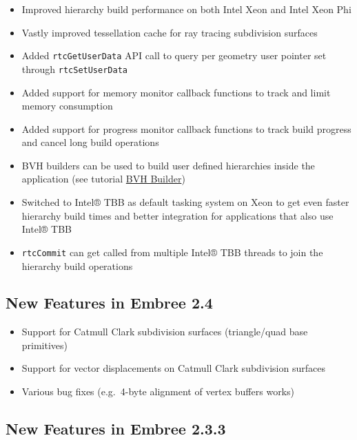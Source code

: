 \begin{itemize}
\tightlist
\item
  Improved hierarchy build performance on both Intel Xeon and Intel Xeon
  Phi
\item
  Vastly improved tessellation cache for ray tracing subdivision
  surfaces
\item
  Added \texttt{rtcGetUserData} API call to query per geometry user
  pointer set through \texttt{rtcSetUserData}
\item
  Added support for memory monitor callback functions to track and limit
  memory consumption
\item
  Added support for progress monitor callback functions to track build
  progress and cancel long build operations
\item
  BVH builders can be used to build user defined hierarchies inside the
  application (see tutorial \hyperref[bvh-builder]{BVH Builder})
\item
  Switched to Intel® TBB as default tasking system on Xeon to get even
  faster hierarchy build times and better integration for applications
  that also use Intel® TBB
\item
  \texttt{rtcCommit} can get called from multiple Intel® TBB threads to
  join the hierarchy build operations
\end{itemize}

\subsection{New Features in Embree
2.4}\label{new-features-in-embree-2.4}

\begin{itemize}
\tightlist
\item
  Support for Catmull Clark subdivision surfaces (triangle/quad base
  primitives)
\item
  Support for vector displacements on Catmull Clark subdivision surfaces
\item
  Various bug fixes (e.g.~4-byte alignment of vertex buffers works)
\end{itemize}

\subsection{New Features in Embree
2.3.3}\label{new-features-in-embree-2.3.3}

